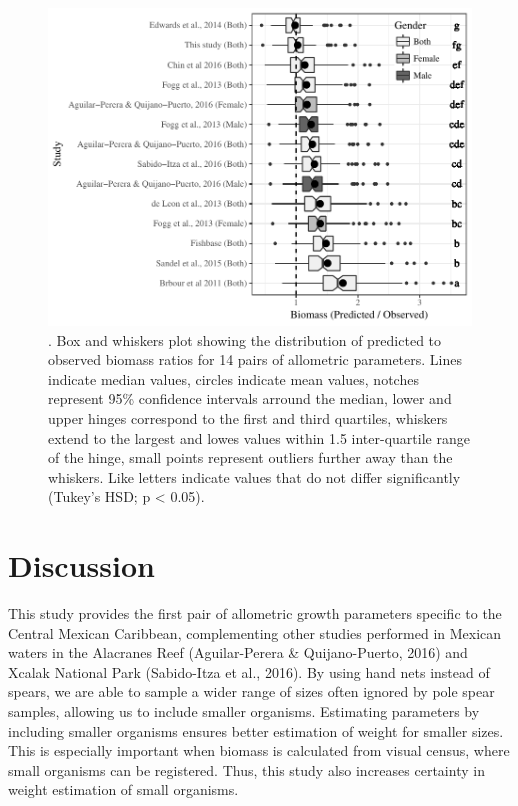 \documentclass[12pt,]{article}
\begin{document}
\begin{figure}[htbp]
\centering
\includegraphics{Manuscript_files/figure-latex/plot comparing predictions-1.pdf}
\caption{. Box and whiskers plot showing the distribution of predicted
to observed biomass ratios for 14 pairs of allometric parameters. Lines
indicate median values, circles indicate mean values, notches represent
95\% confidence intervals arround the median, lower and upper hinges
correspond to the first and third quartiles, whiskers extend to the
largest and lowes values within 1.5 inter-quartile range of the hinge,
small points represent outliers further away than the whiskers. Like
letters indicate values that do not differ significantly (Tukey's HSD; p
\textless{} 0.05).}
\end{figure}

\section{Discussion}\label{discussion}

This study provides the first pair of allometric growth parameters
specific to the Central Mexican Caribbean, complementing other studies
performed in Mexican waters in the Alacranes Reef (Aguilar-Perera \&
Quijano-Puerto, 2016) and Xcalak National Park (Sabido-Itza et al.,
2016). By using hand nets instead of spears, we are able to sample a
wider range of sizes often ignored by pole spear samples, allowing us to
include smaller organisms. Estimating parameters by including smaller
organisms ensures better estimation of weight for smaller sizes. This is
especially important when biomass is calculated from visual census,
where small organisms can be registered. Thus, this study also increases
certainty in weight estimation of small organisms.
\end{document}
